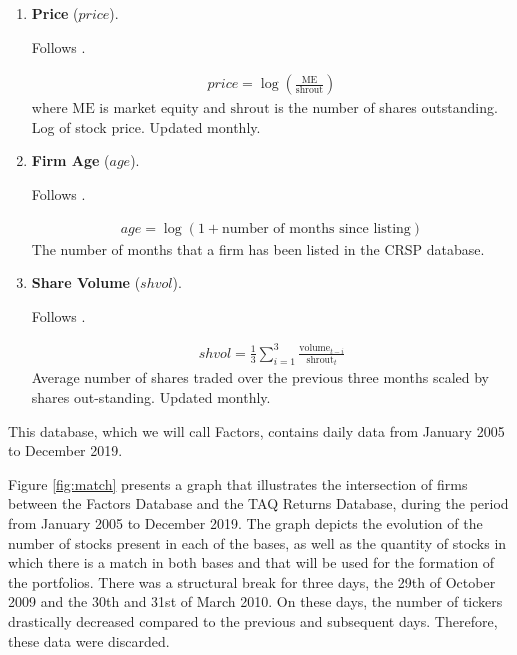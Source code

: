 \begin{enumerate}
	\item \textbf{Price} ($price$). 
	
	Follows . 
	
	\begin{align*}
		price = \log\left( \frac{ \mathrm{ME} }{ \mathrm{shrout} } \right)
	\end{align*}
	where $\mathrm{ME}$ is market equity and $\mathrm{shrout}$ is the number of shares outstanding. Log of stock price. Updated monthly.
	
	
	
	\item \textbf{Firm Age} ($age$). 
	
	Follows . 
	
	\begin{align*}
		age = \log(1 + \text{number of months since listing})
	\end{align*}
	The number of months that a firm has been listed in the CRSP database.
	
	
	
	\item \textbf{Share Volume} ($shvol$). 
	
	Follows . 
	
	\begin{align*}
		shvol = \frac{1}{3} \sum^3_{i=1} \frac{ \mathrm{volume}_{t-i} }{ \mathrm{shrout}_t }
	\end{align*}
	Average number of shares traded over the previous three months scaled by shares out-standing. Updated monthly.
	
	
	
		
\end{enumerate}


This database, which we will call Factors, contains daily data from January 2005 to December 2019.

Figure \ref{fig:match} presents a graph that illustrates the intersection of firms between the Factors Database and the TAQ Returns Database, during the period from January 2005 to December 2019. The graph depicts the evolution of the number of stocks present in each of the bases, as well as the quantity of stocks in which there is a match in both bases and that will be used for the formation of the portfolios. There was a structural break for three days, the 29th of October 2009 and the 30th and 31st of March 2010. On these days, the number of tickers drastically decreased compared to the previous and subsequent days. Therefore, these data were discarded.

